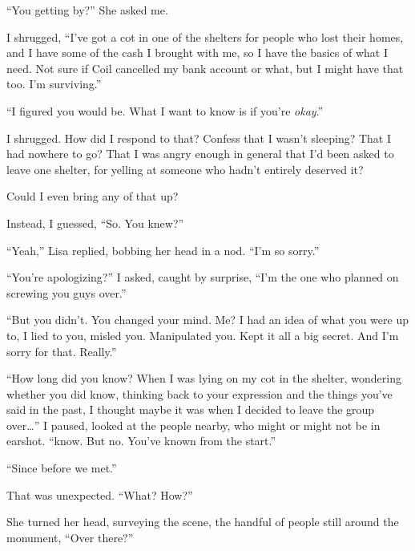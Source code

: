 ``You getting by?'' She asked me.



I shrugged, ``I've got a cot in one of the shelters for people who lost their homes, and I have some of the cash I brought with me, so I have the basics of what I need.  Not sure if Coil cancelled my bank account or what, but I might have that too.  I'm surviving.''



``I figured you would be.  What I want to know is if you're \emph{okay}.''



I shrugged.  How did I respond to that?  Confess that I wasn't sleeping?  That I had nowhere to go?  That I was angry enough in general that I'd been asked to leave one shelter, for yelling at someone who hadn't entirely deserved it?



Could I even bring any of that up?



Instead, I guessed, ``So.  You knew?''



``Yeah,'' Lisa replied, bobbing her head in a nod.  ``I'm so sorry.''



``You're apologizing?'' I asked, caught by surprise, ``I'm the one who planned on screwing you guys over.''



``But you didn't.  You changed your mind.  Me?  I had an idea of what you were up to, I lied to you, misled you.  Manipulated you.  Kept it all a big secret.  And I'm sorry for that.  Really.''



``How long did you know?  When I was lying on my cot in the shelter, wondering whether you did know, thinking back to your expression and the things you've said in the past, I thought maybe it was when I decided to leave the group over\ldots''  I paused, looked at the people nearby, who might or might not be in earshot.  ``\ldotsyou know.  But no.  You've known from the start.''



``Since before we met.''



That was unexpected.  ``What?  How?''



She turned her head, surveying the scene, the handful of people still around the monument, ``Over there?''



